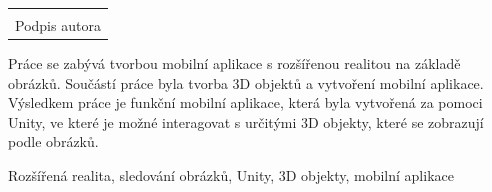 \documentclass[12pt, a4paper,
twoside,        %
openright
]{report}
\newcommand\datumOdevzdani{1. 1. 2024} %
\begin{document}
\cleardoublepage %
	

	

	
	\vspace*{0.7\textheight} %

	\vfill
	\noindent{V Opavě \datumOdevzdani\\}
	\noindent
	\begin{minipage}{\linewidth}
		\hspace{9.5cm} 
		\begin{tabular}{@{}p{6cm}@{}}
			\dotfill \\
			Podpis autora
		\end{tabular}
	\end{minipage}
	
	\cleardoublepage %


Práce se zabývá tvorbou mobilní aplikace s rozšířenou realitou na základě obrázků. Součástí práce byla tvorba 3D objektů a vytvoření mobilní aplikace. Výsledkem práce je funkční mobilní aplikace, která byla vytvořená za pomoci Unity, ve které je možné interagovat s určitými 3D objekty, které se zobrazují podle obrázků.


	
	\vspace{18pt}
	
	
	\noindent Rozšířená realita, sledování obrázků, Unity, 3D objekty, mobilní aplikace
	
\end{document}
